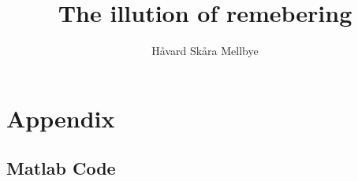 \documentclass[]{article}
\title{The illution of remebering}
\author{Håvard Skåra Mellbye}
\begin{document}
\maketitle







\printbibliography
\section{Appendix}
\subsection{Matlab Code} \label{sec:matlab_code}

\end{document}
